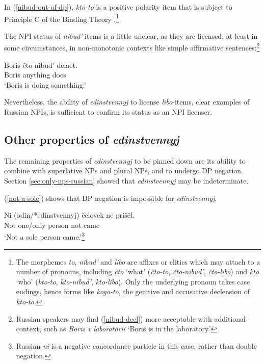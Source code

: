 In (\ref{nibud-out-of-dp}), \textit{kto-to}	is a positive polarity item that is subject to Principle C of the Binding Theory \citep{russneg}.\footnote{The morphemes \textit{to}, \textit{nibud'} and \textit{libo} are affixes or clitics which may attach to a number of pronouns, including \textit{\v{c}to} `what' (\textit{\v{c}to-to}, \textit{\v{c}to-nibud'}, \textit{\v{c}to-libo}) and \textit{kto} `who' (\textit{kto-to}, \textit{kto-nibud'}, \textit{kto-libo}). Only the underlying pronoun takes case endings, hence forms like \textit{kogo-to}, the genitive and accusative declension of \textit{kto-to}.}

The NPI status of \textit{nibud'}-items is a little unclear, as they are licensed, at least in some circumstances, in non-monotonic contexts like simple affirmative sentences:\footnote{Russian speakers may find (\ref{nibud-decl}) more acceptable with additional context, such as \textit{Boris v laboratorii} `Boris is in the laboratory.'}

\begin{exe}
	\ex \label{nibud-decl} \gll Boris \v{c}to-nibud' delaet.\\
	Boris anything does\\
	\glt `Boris is doing something.'
\end{exe}

Nevertheless, the ability of \textit{edinstvennyj} to license \textit{libo}-items, clear examples of Russian NPIs, is sufficient to confirm its status as an NPI licenser.

\subsection{Other properties of \textit{edinstvennyj}}
The remaining properties of \textit{edinstvennyj} to be pinned down are its ability to combine with superlative NPs and plural NPs, and to undergo DP negation. Section \ref{sec:only-nps-russian} showed that \textit{edinstvennyj} may be indeterminate.

(\ref{not-a-sole}) shows that DP negation is impossible for \textit{edinstvennyj}.

\begin{exe}
	\ex \label{not-a-sole} \gll Ni (odin/*edinstvennyj) \v{c}elovek ne pri\v{s}\"{e}l.\\
	Not one/only person not came\\
	\glt `Not a sole person came.'\footnote{Russian \textit{ni} is a negative concordance particle in this case, rather than double negation.}
\end{exe}

